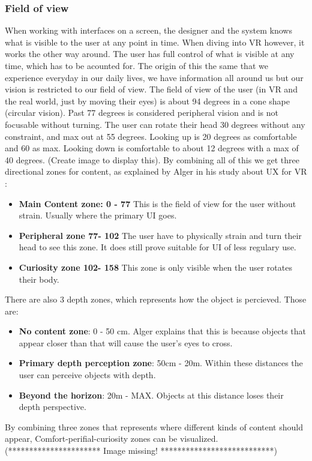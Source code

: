\subsubsection{Field of view}
When working with interfaces on a screen, the designer and the system knows what is visible to the user at any point in time. When diving into VR however, it works the other way around. The user has full control of what is visible at any time, which has to be acounted for. The origin of this the same that we experience everyday in our daily lives, we have information all around us but our vision is restricted to our field of view. The field of view of the user (in VR and the real world, just by moving their eyes) is about 94 degrees in a cone shape (circular vision). Past 77 degrees is considered peripheral vision and is not focusable without turning. The user can rotate their head 30 degrees without any constraint, and max out at 55 degrees. Looking up is 20 degrees as comfortable and 60 as max. Looking down is comfortable to about 12 degrees with a max of 40 degrees. (Create image to display this). By combining all of this we get three directional zones for content, as explained by Alger in his study about UX for VR \cite{UX:Alger2015}:
\begin{itemize}
  \item \textbf{Main Content zone: 0 - 77\degree} This is the field of view for the user without strain. Usually where the primary UI goes.
  \item \textbf{Peripheral zone 77\degree - 102\degree} The user have to physically strain and turn their head to see this zone. It does still prove suitable for UI of less regulary use.
  \item \textbf{Curiosity zone 102\degree - 158\degree} This zone is only visible when the user rotates their body.
\end{itemize}
There are also 3 depth zones, which represents how the object is percieved. Those are:
\begin{itemize}
\item \textbf{No content zone}: 0 - 50 cm. Alger explains that this is because objects that appear closer than that will cause the user's eyes to cross.
\item \textbf{Primary depth perception zone}: 50cm - 20m. Within these distances the user can perceive objects with depth.
\item \textbf{Beyond the horizon}: 20m - MAX. Objects at this distance loses their depth perspective.
\end{itemize}
By combining three zones that represents where different kinds of content should appear,  Comfort-perifial-curiosity zones can be visualized. \cite{UX:Alger2015} (********************** Image missing! ***************************)
